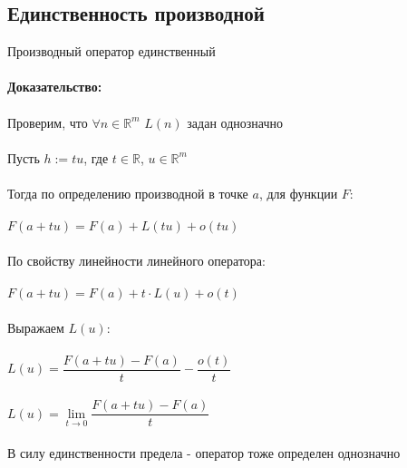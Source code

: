 \documentclass[../main.tex]{subfiles}
\begin{document}
\subsection{Единственность производной}
Производный оператор единственный\\\\
\textbf{Доказательство:}\\\\
Проверим, что $\forall n \in \mathbb{R}^m$ $L(n)$ задан однозначно\\\\
Пусть $h := tu$, где $t \in \mathbb{R}$, $u \in \mathbb{R}^m$\\\\
Тогда по определению производной в точке $a$, для функции $F$:\\\\
$F(a + tu) = F(a) + L(tu) + o(tu)$\\\\
По свойству линейности линейного оператора: \\\\
$F(a + tu) = F(a) + t \cdot L(u) + o(t)$\\\\
Выражаем $L(u)$:\\\\
$L(u) = \dfrac{F(a + tu) - F(a)}{t} - \dfrac{o(t)}{t}$\\\\
$L(u) = \lim\limits_{t \rightarrow 0} \dfrac{F(a + tu) - F(a)}{t}$\\\\
В силу единственности предела - оператор тоже определен однозначно

\newpage
\end{document}
